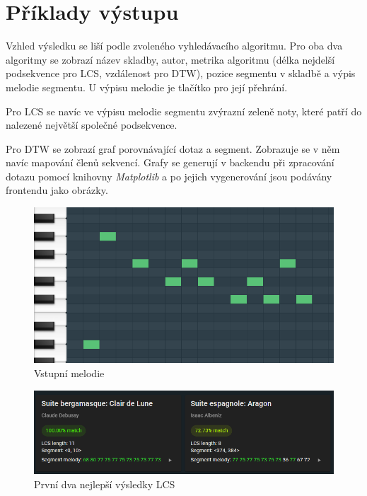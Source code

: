 \section{Příklady výstupu}

Vzhled výsledku se liší podle zvoleného vyhledávacího algoritmu. Pro oba dva algoritmy se zobrazí název skladby, autor, metrika algoritmu (délka nejdelší podsekvence pro LCS, vzdálenost pro DTW), pozice segmentu v skladbě a výpis melodie segmentu. U výpisu melodie je tlačítko pro její přehrání.

Pro LCS se navíc ve výpisu melodie segmentu zvýrazní zeleně noty, které patří do nalezené největší společné podsekvence.

Pro DTW se zobrazí graf porovnávající dotaz a segment. Zobrazuje se v něm navíc mapování členů sekvencí. Grafy se generují v backendu při zpracování dotazu pomocí knihovny \textit{Matplotlib} a po jejich vygenerování jsou podávány frontendu jako obrázky.

\begin{figure}[!ht]
    \centering
    \caption{Vstupní melodie}
    \includegraphics[width=\textwidth]{images/input_melody.png}
\end{figure}

\begin{figure}[!ht]
    \centering
    \caption{První dva nejlepší výsledky LCS}
    \includegraphics[width=\textwidth]{images/lcs_results.png}
\end{figure}

